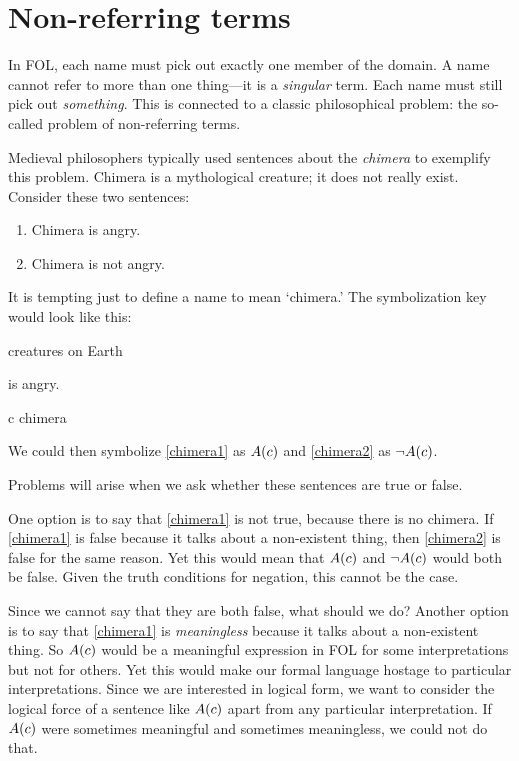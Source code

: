 \section{Non-referring terms}

In FOL, each name must pick out exactly one member of the domain. A name cannot refer to more than one thing---it is a \emph{singular} term. Each name must still pick out \emph{something}. This is connected to a classic philosophical problem: the so-called problem of non-referring terms.

Medieval philosophers typically used sentences about the \emph{chimera} to exemplify this problem. Chimera is a mythological creature; it does not really exist. Consider these two sentences:
\begin{enumerate}
\item\label{chimera1} Chimera is angry.
\item\label{chimera2} Chimera is not angry.
\end{enumerate}
It is tempting just to define a name to mean `chimera.' The symbolization key would look like this:
\begin{ekey}
\item[\text{domain}] creatures on Earth
\item[\atom{A}{x}]  is angry.
\item[c] chimera
\end{ekey}
We could then symbolize \cref*{chimera1} as $A(c)$ and \cref*{chimera2} as $\neg A(c)$.

Problems will arise when we ask whether these sentences are true or false.

One option is to say that \cref*{chimera1} is not true, because there is no chimera. If \cref*{chimera1} is false because it talks about a non-existent thing, then \cref*{chimera2} is false for the same reason. Yet this would mean that $A(c)$ and $\neg A(c)$ would both be false. Given the truth conditions for negation, this cannot be the case.

Since we cannot say that they are both false, what should we do? Another option is to say that \cref*{chimera1} is \emph{meaningless} because it talks about a non-existent thing. So $A(c)$ would be a meaningful expression in FOL for some interpretations but not for others. Yet this would make our formal language hostage to particular interpretations. Since we are interested in logical form, we want to consider the logical force of a sentence like $A(c)$ apart from any particular interpretation. If $A(c)$ were sometimes meaningful and sometimes meaningless, we could not do that.

